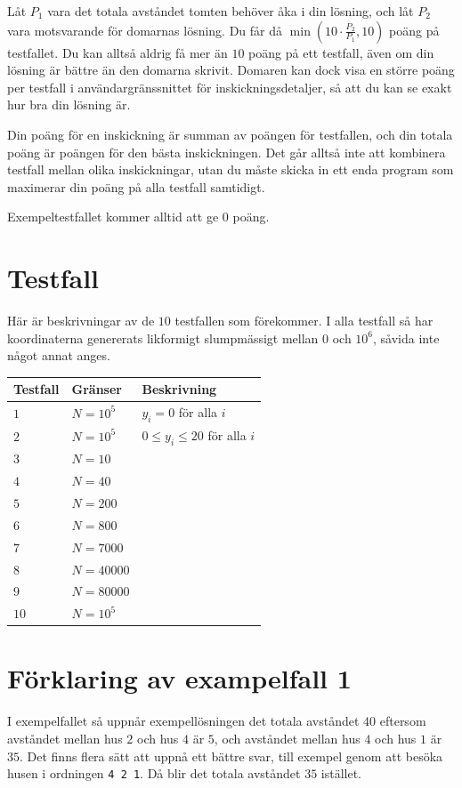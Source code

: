 Låt $P_1$ vara det totala avståndet tomten behöver åka i din lösning, och låt $P_2$ vara motsvarande
för domarnas lösning. Du får då $\min(10 \cdot \frac{P_2}{P_1}, 10)$ poäng på testfallet.
Du kan alltså aldrig få mer än $10$ poäng på ett testfall, även om din lösning är bättre än den domarna skrivit.
Domaren kan dock visa en större poäng per testfall i användargränssnittet för inskickningsdetaljer, så att du kan se exakt hur bra din lösning är.

Din poäng för en inskickning är summan av poängen för testfallen, och din totala poäng är poängen för den bästa inskickningen.
Det går alltså inte att kombinera testfall mellan olika inskickningar, utan du måste skicka in ett enda program som
maximerar din poäng på alla testfall samtidigt.

Exempeltestfallet kommer alltid att ge $0$ poäng.

\section*{Testfall}
Här är beskrivningar av de $10$ testfallen som förekommer. I alla testfall så har koordinaterna
genererats likformigt slumpmässigt mellan $0$ och $10^6$, såvida inte något annat anges.


\noindent
\begin{tabular}{| l | l | l |}
\hline
    \textbf{Testfall} & \textbf{Gränser}                                     & \textbf{Beskrivning}  \\ \hline
$1$       & $N = 10^5$                                 & $y_i = 0$ för alla $i$  \\ \hline
$2$       & $N = 10^5$                                 & $0 \leq y_i \leq 20$ för alla $i$   \\ \hline
$3$       & $N = 10$                                   &    \\ \hline
$4$       & $N = 40$                                   &   \\ \hline
$5$       & $N = 200$                                   &    \\ \hline
$6$       & $N = 800$                                   &    \\ \hline
$7$       & $N = 7000$                                   &    \\ \hline
$8$       & $N = 40000$                                   &   \\ \hline
$9$       & $N = 80000$                                   &    \\ \hline
$10$      & $N = 10^5$                                   &    \\ \hline
\end{tabular}

\section*{Förklaring av exampelfall 1}
I exempelfallet så uppnår exempellösningen det totala avståndet $40$ eftersom avståndet mellan hus $2$ och hus $4$
är $5$, och avståndet mellan hus $4$ och hus $1$ är $35$. Det finns flera sätt att uppnå ett bättre svar,
till exempel genom att besöka husen i ordningen \verb|4 2 1|. Då blir det totala avståndet $35$ istället.

